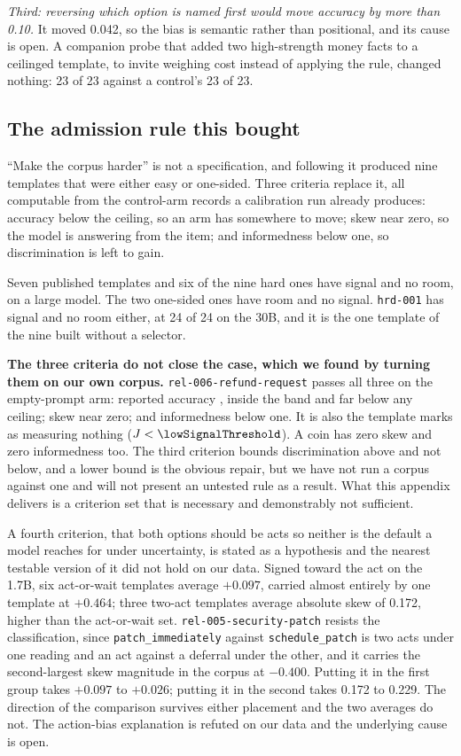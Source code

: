 \emph{Third: reversing which option is named first would move accuracy by
more than 0.10.} It moved 0.042, so the bias is semantic rather than
positional, and its cause is open. A companion probe that added two
high-strength money facts to a ceilinged template, to invite weighing cost
instead of applying the rule, changed nothing: 23 of 23 against a control's
23 of 23.

\subsection{The admission rule this bought}

``Make the corpus harder'' is not a specification, and following it produced
nine templates that were either easy or one-sided. Three criteria replace it,
all computable from the control-arm records a calibration run already
produces: accuracy below the ceiling, so an arm has somewhere to move; skew
near zero, so the model is answering from the item; and informedness below
one, so discrimination is left to gain.

Seven published templates and six of the nine hard ones have signal and no
room, on a large model. The two one-sided ones have room and no signal.
\texttt{hrd-001} has signal and no room either, at 24 of 24 on the 30B, and
it is the one template of the nine built without a selector.

\textbf{The three criteria do not close the case, which we found by turning
them on our own corpus.} \texttt{rel-006-refund-request} passes all three on
the empty-prompt arm: reported accuracy
\NUM{\accSeenRelZeroZeroSixRefundRequestOff}, inside the band and far
below any ceiling; skew near zero; and informedness below one. It is also the
template  marks as measuring nothing ($J < \NUM{\lowSignalThreshold}$).
A coin has zero skew and zero informedness too. The third
criterion bounds discrimination above and not below, and a lower bound is
the obvious repair, but we have not run a corpus against one and will not
present an untested rule as a result. What this appendix delivers is a
criterion set that is necessary and demonstrably not sufficient.

A fourth criterion, that both options should be acts so neither is the
default a model reaches for under uncertainty, is stated as a hypothesis and
the nearest testable version of it did not hold on our data. Signed toward
the act on the 1.7B, six act-or-wait templates average $+0.097$, carried
almost entirely by one template at $+0.464$; three two-act templates average
absolute skew of 0.172, higher than the act-or-wait set.
\texttt{rel-005-security-patch} resists the classification, since
\texttt{patch\_immediately} against \texttt{schedule\_patch} is two acts
under one reading and an act against a deferral under the other, and it
carries the second-largest skew magnitude in the corpus at $-0.400$.
Putting it in the first group takes $+0.097$ to $+0.026$; putting it in the
second takes 0.172 to 0.229. The direction of the comparison survives
either placement and the two averages do not. The action-bias explanation
is refuted on our data and the underlying cause is open.

